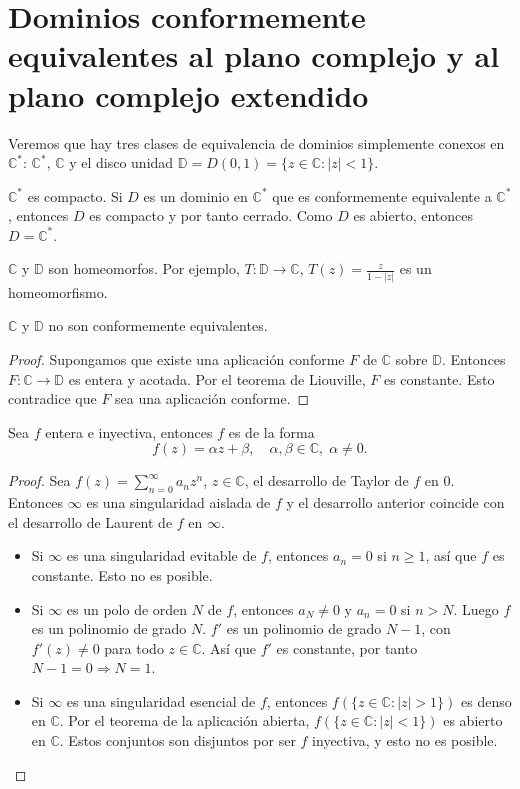 \section{Dominios conformemente equivalentes al plano complejo y al plano complejo extendido}
Veremos que hay tres clases de equivalencia de dominios simplemente conexos en $\mathbb{C}^\ast$: $\mathbb{C}^\ast$, $\mathbb{C}$ y el disco unidad $\mathbb{D} = D(0, 1) = \{z \in \mathbb{C} : |z| < 1\}$.

$\mathbb{C}^\ast$ es compacto.
Si $D$ es un dominio en $\mathbb{C}^\ast$ que es conformemente equivalente a $\mathbb{C}^\ast$, entonces $D$ es compacto y por tanto cerrado.
Como $D$ es abierto, entonces $D = \mathbb{C}^\ast$.

$\mathbb{C}$ y $\mathbb{D}$ son homeomorfos.
Por ejemplo, $T: \mathbb{D} \to \mathbb{C}$, $T(z) = \frac{z}{1-|z|}$ es un homeomorfismo.

\begin{proposition}
    $\mathbb{C}$ y $\mathbb{D}$ no son conformemente equivalentes.
\end{proposition}

\begin{proof}
    Supongamos que existe una aplicación conforme $F$ de $\mathbb{C}$ sobre $\mathbb{D}$.
    Entonces $F: \mathbb{C} \to \mathbb{D}$ es entera y acotada.
    Por el teorema de Liouville, $F$ es constante.
    Esto contradice que $F$ sea una aplicación conforme.
\end{proof}

\begin{proposition}
    Sea $f$ entera e inyectiva, entonces $f$ es de la forma
    $$f(z) = \alpha z + \beta, \quad \alpha, \beta \in \mathbb{C}, \; \alpha \neq 0.$$
\end{proposition}

\begin{proof}
    Sea $f(z) = \sum_{n=0}^\infty a_nz^n$, $z \in \mathbb{C}$, el desarrollo de Taylor de $f$ en 0.
    Entonces $\infty$ es una singularidad aislada de $f$ y el desarrollo anterior coincide con el desarrollo de Laurent de $f$ en $\infty$.
    \begin{itemize}
        \item Si $\infty$ es una singularidad evitable de $f$, entonces $a_n = 0$ si $n \geq 1$, así que $f$ es constante.
              Esto no es posible.
        \item Si $\infty$ es un polo de orden $N$ de $f$, entonces $a_N \neq 0$ y $a_n = 0$ si $n > N$.
              Luego $f$ es un polinomio de grado $N$.
              $f'$ es un polinomio de grado $N-1$, con $f'(z) \neq 0$ para todo $z \in \mathbb{C}$.
              Así que $f'$ es constante, por tanto $N - 1 = 0 \Rightarrow N = 1$.
        \item Si $\infty$ es una singularidad esencial de $f$, entonces $f(\{z \in \mathbb{C} : |z| > 1\})$ es denso en $\mathbb{C}$.
              Por el teorema de la aplicación abierta, $f(\{z \in \mathbb{C} : |z| < 1\})$ es abierto en $\mathbb{C}$.
              Estos conjuntos son disjuntos por ser $f$ inyectiva, y esto no es posible.
    \end{itemize}
\end{proof}

